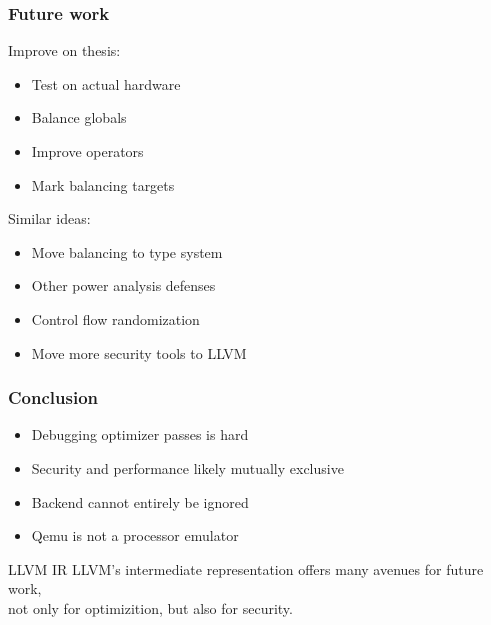 \documentclass[11pt,t,usepdftitle=false,aspectratio=169]{beamer}
\begin{document}
\begin{frame}
  \frametitle{Future work}
  Improve on thesis:
  \begin{itemize}
  \item Test on actual hardware
  \item Balance globals
  \item Improve operators
  \item Mark balancing targets
  \end{itemize}
  \vspace{0.5cm}
  Similar ideas:
  \begin{itemize}
  \item Move balancing to type system
  \item Other power analysis defenses
  \item Control flow randomization
  \item Move more security tools to LLVM
  \end{itemize}
\end{frame}

\begin{frame}
  \frametitle{Conclusion}
  \begin{itemize}
  \item Debugging optimizer passes is hard
  \item Security and performance likely mutually exclusive
  \item Backend cannot entirely be ignored
  \item Qemu is not a processor emulator
  \end{itemize}
  \vfill
  \begin{block}{LLVM IR}
    LLVM's intermediate representation offers many avenues for future work,\\
    not only for optimizition, but also for security.
  \end{block}
\end{frame}

\begin{frame}
\end{frame}

\appendix
\end{document}
